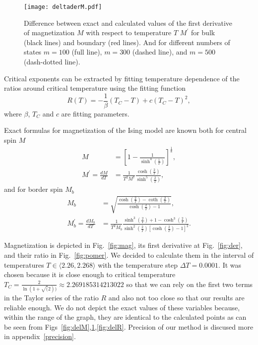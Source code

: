 \documentclass[showpacs,amssymb,twocolumn,floatfix,aps,pre,notitlepage]{revtex4-2}
\begin{document}
\begin{figure}[h!]
\begin{center}
\texttt{[image: deltaderM.pdf]}
\caption{Difference between exact and calculated values of the first derivative of magnetization $M$ with respect to temperature $T$ $M^{\prime}$ for bulk (black lines) and boundary (red lines). And for different numbers of states $m = 100$ (full line), $m = 300$ (dashed line), and $m = 500$ (dash-dotted line).}
\label{fig:delMp}
\end{center}
\end{figure}

Critical exponents can be extracted by fitting temperature dependence of the ratios around critical temperature using the fitting function
\begin{equation}\label{rfit}
R(T) =  -\frac1\beta\left(T_C - T\right) + c\left(T_C - T\right)^2,
\end{equation}
where $\beta$, $T_C$ and $c$ are fitting parameters.



Exact formulas for magnetization of the Ising model are known both for central spin $M$ ~\cite{yang} 
\begin{eqnarray}\label{exactbulk}
M &= \left[ 1- \frac1{\sinh^4\left(\frac1T\right)}\right]^{\frac18},\\
M^{\prime} = \frac{dM}{dT} &=  \frac1{T^2M^7}\frac{\cosh\left(\frac2T\right)}{\sinh^5\left(\frac2T\right)},
\end{eqnarray}
and for border spin $M_b$ \cite{mccoy}
\begin{eqnarray}\label{exactcorner}
M_b &= \sqrt{\frac{\cosh\left(\frac2T\right) - \coth\left(\frac2T\right)}{\cosh\left(\frac2T\right)-1}},\\
M_b^{\prime} = \frac{dM_b}{dT} &= \frac{1}{T^2M_b}\frac{\sinh^3\left(\frac2T\right)+1-\cosh^3\left(\frac2T\right)}{\sinh^2\left(\frac2T\right)\left[\cosh\left(\frac2T\right)-1\right]^2}.
\end{eqnarray}

Magnetization is depicted in Fig.~\ref{fig:mag}, its first derivative at Fig.~\ref{fig:der}, and their ratio in Fig.~\ref{fig:pomer}. We decided to calculate them in the interval of temperatures $T\in\langle 2.26,2.268\rangle$ with the temperature step $\Delta T= 0.0001$. It was chosen because it is close enough to critical temperature $T_C = \frac{2}{\ln(1 + \sqrt(2) )} \approx 2.269185314213022$ so that we can rely on the first two terms in the Taylor series of the ratio $R$ and also not too close so that our results are reliable enough. We do not depict the exact values of these variables because, within the range of the graph, they are identical to the calculated points as can be seen from Figs~\ref{fig:delM},\ref{fig:delMp},\ref{fig:delR}. Precision of our method is discused more in appendix~\ref{precision}.
\end{document}
